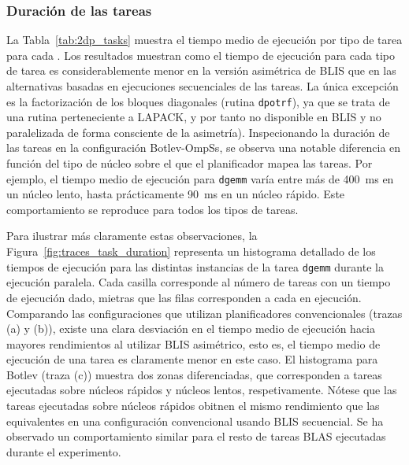 \subsubsection{Duración de las tareas}
 
La Tabla~\ref{tab:2dp_tasks} muestra el tiempo medio de ejecución por tipo de tarea para cada \wt.
Los resultados muestran como el tiempo de ejecución para cada tipo de tarea es considerablemente menor
en la versión asimétrica de BLIS que en las alternativas basadas en ejecuciones secuenciales de las
tareas. La única excepción es la factorización de los bloques diagonales (rutina {\tt dpotrf}), ya que
se trata de una rutina perteneciente a LAPACK, y por tanto no disponible en BLIS y no paralelizada de forma
consciente de la asimetría). Inspecionando la duración de las tareas en la configuración Botlev-OmpSs, 
se observa una notable diferencia en función del tipo de núcleo sobre el que el planificador mapea las tareas. Por
ejemplo, el tiempo medio de ejecución para {\tt dgemm} varía entre más de 400~ms en un núcleo lento, hasta prácticamente
90~ms en un núcleo rápido. Este comportamiento se reproduce para todos los tipos de tareas.

Para ilustrar más claramente estas observaciones, la Figura~\ref{fig:traces_task_duration} representa un histograma
detallado de los tiempos de ejecución para las distintas instancias de la tarea {\tt dgemm} durante la ejecución
paralela. Cada casilla corresponde al número de tareas con un tiempo de ejecución dado, mietras que las filas corresponden
a cada \wt en ejecución.
Comparando las configuraciones que utilizan planificadores convencionales (trazas (a) y (b)),
existe una clara desviación en el tiempo medio de ejecución hacia mayores rendimientos al utilizar
BLIS asimétrico, esto es, el tiempo medio de ejecución de una tarea es claramente menor en este caso. El histograma para Botlev (traza (c))
muestra dos zonas diferenciadas, que corresponden a tareas ejecutadas sobre núcleos rápidos y núcleos lentos, respetivamente. Nótese que
las tareas ejecutadas sobre núcleos rápidos obitnen el mismo rendimiento que las equivalentes en una configuración convencional
usando BLIS secuencial. Se ha observado un comportamiento similar para el resto de tareas BLAS ejecutadas durante el experimento.

